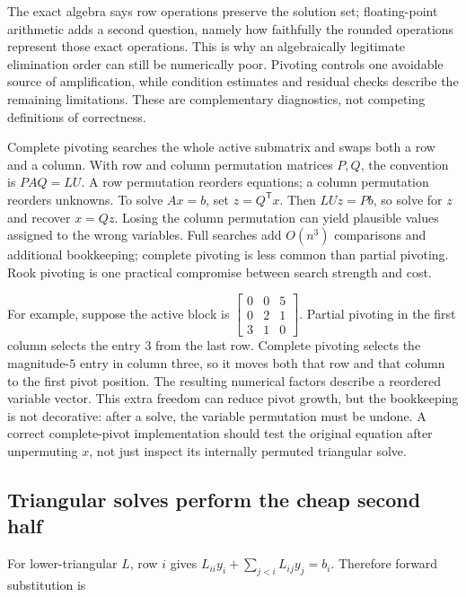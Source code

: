 The exact algebra says row operations preserve the solution set; floating-point arithmetic adds a second question, namely how faithfully the rounded operations represent those exact operations. This is why an algebraically legitimate elimination order can still be numerically poor. Pivoting controls one avoidable source of amplification, while condition estimates and residual checks describe the remaining limitations. These are complementary diagnostics, not competing definitions of correctness.

Complete pivoting searches the whole active submatrix and swaps both a row and a column. With row and column permutation matrices \(P,Q\), the convention is \(PAQ=LU\). A row permutation reorders equations; a column permutation reorders unknowns. To solve \(Ax=b\), set \(z=Q^\mathsf T x\). Then \(LUz=Pb\), so solve for \(z\) and recover \(x=Qz\). Losing the column permutation can yield plausible values assigned to the wrong variables. Full searches add \(O(n^3)\) comparisons and additional bookkeeping; complete pivoting is less common than partial pivoting. Rook pivoting is one practical compromise between search strength and cost.

For example, suppose the active block is \(\begin{bmatrix}0&0&5\\0&2&1\\3&1&0\end{bmatrix}\). Partial pivoting in the first column selects the entry \(3\) from the last row. Complete pivoting selects the magnitude-\(5\) entry in column three, so it moves both that row and that column to the first pivot position. The resulting numerical factors describe a reordered variable vector. This extra freedom can reduce pivot growth, but the bookkeeping is not decorative: after a solve, the variable permutation must be undone. A correct complete-pivot implementation should test the original equation after unpermuting \(x\), not just inspect its internally permuted triangular solve.

\subsection{Triangular solves perform the cheap second half}\label{01-foundations-i-ch019-triangular-solves-perform-the-cheap-second-half}

For lower-triangular \(L\), row \(i\) gives \(L_{ii}y_i+\sum_{j<i}L_{ij}y_j=b_i\). Therefore forward substitution is

